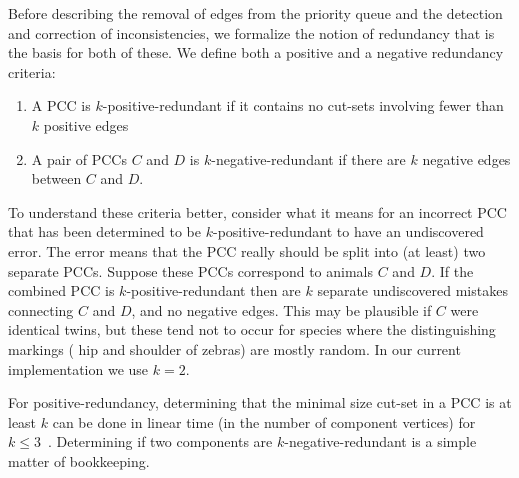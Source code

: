 Before describing the removal of edges from the priority queue and the
detection and correction of inconsistencies, we formalize the notion of
redundancy that is the basis for both of these.
We define both a positive and a negative redundancy criteria:
\begin{enumerate}[label={(\arabic*)},noitemsep,nolistsep]

    \item %
    A PCC is $k$-positive-redundant if it contains no cut-sets involving fewer
      than $k$ positive edges %

    \item %
    A pair of PCCs $C$ and $D$ is $k$-negative-redundant if there are $k$
      negative edges between $C$ and $D$.


\end{enumerate}
To understand these criteria better, consider what it means for an incorrect
  PCC that has been determined to be $k$-positive-redundant to have an
  undiscovered error.
The error means that the PCC really should be split into (at least) two
  separate PCCs.
Suppose these PCCs correspond to animals $C$ and $D$.
If the combined PCC is $k$-positive-redundant then are $k$ separate
  undiscovered mistakes connecting $C$ and $D$, and no negative edges.
This may be plausible if $C$ were identical twins, but these tend not to occur
  for species where the distinguishing markings (\eg{} hip and shoulder of
  zebras) are mostly random.
In our current implementation we use $k=2$.

For positive-redundancy, determining that the minimal size cut-set in a PCC is
  at least $k$ can be done in linear time (in the number of component vertices)
  for $k \leq 3$~\cite{wang_simple_2015}.
Determining if two components are $k$-negative-redundant is a simple matter of
  bookkeeping.

